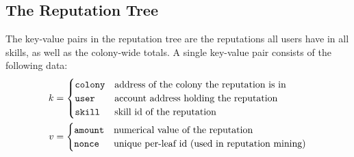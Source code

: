 \subsection{The Reputation Tree}\label{sec:reptree}

The key-value pairs in the reputation tree are the reputations all users have in all skills, as well as the colony-wide totals. A single key-value pair consists of the following data:
\begin{align*}
k &=
  \begin{cases}
  \texttt{colony} & \textnormal{address of the colony the reputation is in}\\
  \texttt{user} & \textnormal{account address holding the reputation}\\
  \texttt{skill} & \textnormal{skill id of the reputation}
  \end{cases}\\
v &=
  \begin{cases}
  \texttt{amount} & \textnormal{numerical value of the reputation}\\
  \texttt{nonce} & \textnormal{unique per-leaf id (used in reputation mining)}
  \end{cases}
\end{align*}


